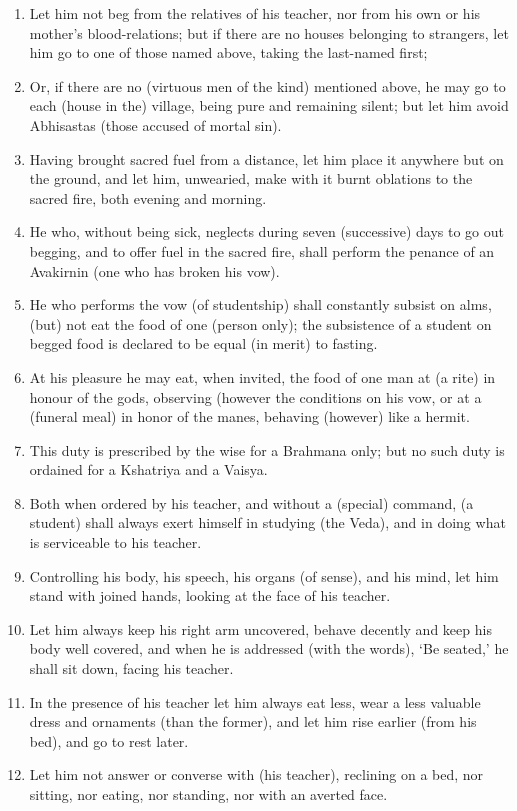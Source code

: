\begin{enumerate}
\item Let him not beg from the relatives of his teacher, nor from his own or his mother's blood-relations; but if there are no houses belonging to strangers, let him go to one of those named above, taking the last-named first;
\item Or, if there are no (virtuous men of the kind) mentioned above, he may go to each (house in the) village, being pure and remaining silent; but let him avoid Abhisastas (those accused of mortal sin).
\item Having brought sacred fuel from a distance, let him place it anywhere but on the ground, and let him, unwearied, make with it burnt oblations to the sacred fire, both evening and morning.
\item He who, without being sick, neglects during seven (successive) days to go out begging, and to offer fuel in the sacred fire, shall perform the penance of an Avakirnin (one who has broken his vow).
\item He who performs the vow (of studentship) shall constantly subsist on alms, (but) not eat the food of one (person only); the subsistence of a student on begged food is declared to be equal (in merit) to fasting.
\item At his pleasure he may eat, when invited, the food of one man at (a rite) in honour of the gods, observing (however the conditions on his vow, or at a (funeral meal) in honor of the manes, behaving (however) like a hermit.
\item This duty is prescribed by the wise for a Brahmana only; but no such duty is ordained for a Kshatriya and a Vaisya.
\item Both when ordered by his teacher, and without a (special) command, (a student) shall always exert himself in studying (the Veda), and in doing what is serviceable to his teacher.
\item Controlling his body, his speech, his organs (of sense), and his mind, let him stand with joined hands, looking at the face of his teacher.
\item Let him always keep his right arm uncovered, behave decently and keep his body well covered, and when he is addressed (with the words), `Be seated,' he shall sit down, facing his teacher.
\item In the presence of his teacher let him always eat less, wear a less valuable dress and ornaments (than the former), and let him rise earlier (from his bed), and go to rest later.
\item Let him not answer or converse with (his teacher), reclining on a bed, nor sitting, nor eating, nor standing, nor with an averted face.

\end{enumerate}
